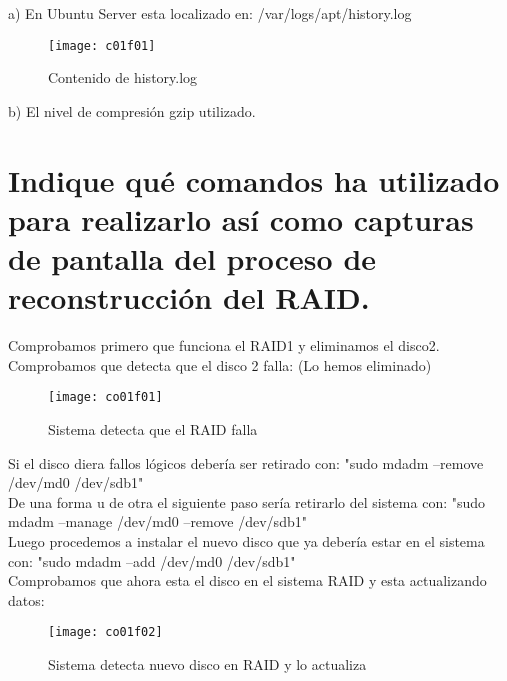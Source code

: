 a) En Ubuntu Server esta localizado en: /var/logs/apt/history.log

\begin{figure}[H]
	\centering
	\texttt{[image: c01f01]}
	\caption{Contenido de history.log}
	\label{fig:c01f01}
\end{figure}


b) El nivel de compresión gzip utilizado.

\clearpage
\section{Indique qué comandos ha utilizado para realizarlo así como capturas de pantalla del proceso de reconstrucción del RAID. \cite{c01o}}

Comprobamos primero que funciona el RAID1 y eliminamos el disco2. Comprobamos que detecta que el disco 2 falla: (Lo hemos eliminado)

\begin{figure}[H]
	\centering
	\texttt{[image: co01f01]}
	\caption{Sistema detecta que el RAID falla}
	\label{fig:co01f01}
\end{figure}


Si el disco diera fallos lógicos debería ser retirado con: "sudo mdadm --remove /dev/md0 /dev/sdb1"\\

De una forma u de otra el siguiente paso sería retirarlo del sistema con: "sudo mdadm --manage /dev/md0 --remove /dev/sdb1"\\

Luego procedemos a instalar el nuevo disco que ya debería estar en el sistema con: "sudo mdadm --add /dev/md0 /dev/sdb1"\\

Comprobamos que ahora esta el disco en el sistema RAID y esta actualizando datos:

\begin{figure}[H]
	\centering
	\texttt{[image: co01f02]}
	\caption{Sistema detecta nuevo disco en RAID y lo actualiza}
	\label{fig:co01f02}
\end{figure}



